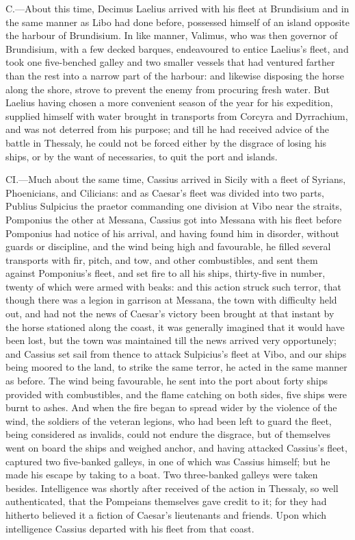 C.—About this time, Decimus Laelius arrived with his fleet at
Brundisium and in the same manner as Libo had done before, possessed
himself of an island opposite the harbour of Brundisium. In like manner,
Valimus, who was then governor of Brundisium, with a few decked barques,
endeavoured to entice Laelius's fleet, and took one five-benched galley
and two smaller vessels that had ventured farther than the rest into a
narrow part of the harbour: and likewise disposing the horse along the
shore, strove to prevent the enemy from procuring fresh water. But
Laelius having chosen a more convenient season of the year for his
expedition, supplied himself with water brought in transports from
Corcyra and Dyrrachium, and was not deterred from his purpose; and till
he had received advice of the battle in Thessaly, he could not be forced
either by the disgrace of losing his ships, or by the want of
necessaries, to quit the port and islands.

CI.—Much about the same time, Cassius arrived in Sicily with a fleet of
Syrians, Phoenicians, and Cilicians: and as Caesar's fleet was divided
into two parts, Publius Sulpicius the praetor commanding one division at
Vibo near the straits, Pomponius the other at Messana, Cassius got into
Messana with his fleet before Pomponius had notice of his arrival, and
having found him in disorder, without guards or discipline, and the wind
being high and favourable, he filled several transports with fir, pitch,
and tow, and other combustibles, and sent them against Pomponius's
fleet, and set fire to all his ships, thirty-five in number, twenty of
which were armed with beaks: and this action struck such terror, that
though there was a legion in garrison at Messana, the town with
difficulty held out, and had not the news of Caesar's victory been
brought at that instant by the horse stationed along the coast, it was
generally imagined that it would have been lost, but the town was
maintained till the news arrived very opportunely; and Cassius set sail
from thence to attack Sulpicius's fleet at Vibo, and our ships being
moored to the land, to strike the same terror, he acted in the same
manner as before. The wind being favourable, he sent into the port about
forty ships provided with combustibles, and the flame catching on both
sides, five ships were burnt to ashes. And when the fire began to spread
wider by the violence of the wind, the soldiers of the veteran legions,
who had been left to guard the fleet, being considered as invalids,
could not endure the disgrace, but of themselves went on board the ships
and weighed anchor, and having attacked Cassius's fleet, captured two
five-banked galleys, in one of which was Cassius himself; but he made
his escape by taking to a boat. Two three-banked galleys were taken
besides. Intelligence was shortly after received of the action in
Thessaly, so well authenticated, that the Pompeians themselves gave
credit to it; for they had hitherto believed it a fiction of Caesar's
lieutenants and friends. Upon which intelligence Cassius departed with
his fleet from that coast.

